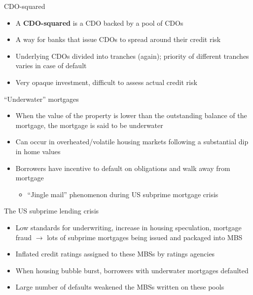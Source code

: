 \documentclass{beamer}
\begin{document}
\begin{frame}{CDO-squared}

\begin{itemize}
\item A \textbf{CDO-squared} is a CDO backed by a pool of CDOs
\item A way for banks that issue CDOs to spread around their credit risk
\item Underlying CDOs divided into tranches (again); priority of different tranches varies in case of default
\item Very opaque investment, difficult to assess actual credit risk
\end{itemize}

\end{frame}

\begin{frame}{``Underwater'' mortgages}

\begin{itemize}
\item When the value of the property is lower than the outstanding balance of the mortgage, the mortgage is said to be underwater
\item Can occur in overheated/volatile housing markets following a substantial dip in home values
\item Borrowers have incentive to default on obligations and walk away from mortgage
  \begin{itemize}
  \item ``Jingle mail'' phenomenon during US subprime mortgage crisis
  \end{itemize}
\end{itemize}

\end{frame}

\begin{frame}{The US subprime lending crisis}

\begin{itemize}
\item Low standards for underwriting, increase in housing speculation, mortgage fraud $\rightarrow$ lots of subprime mortgages being issued and packaged into MBS
\item Inflated credit ratings assigned to these MBSs by ratings agencies
\item When housing bubble burst, borrowers with underwater mortgages defaulted
\item Large number of defaults weakened the MBSs written on these pools
\end{itemize}

\end{frame}
\end{document}
